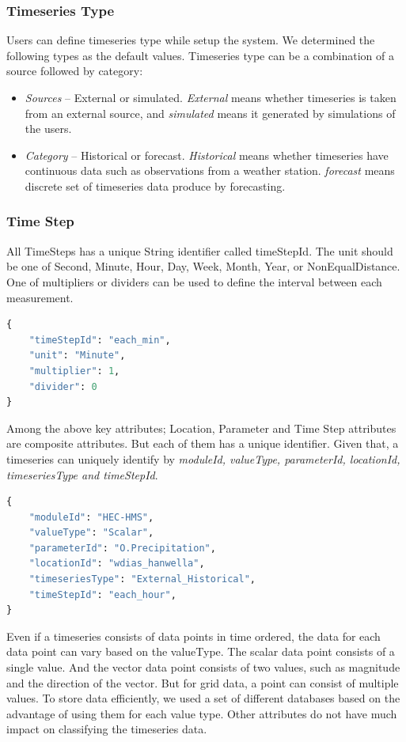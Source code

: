 \subsubsection{Timeseries Type}
Users can define timeseries type while setup the system. We determined the following types as the default values. Timeseries type can be a combination of a source followed by category:
\begin{itemize}
  \item \emph{Sources} -- External or simulated. \emph{External} means whether timeseries is taken from an external source, and \emph{simulated} means it generated by simulations of the users.
  \item \emph{Category} -- Historical or forecast. \emph{Historical} means whether timeseries have continuous data such as observations from a weather station. \emph{forecast} means discrete set of timeseries data produce by forecasting.
\end{itemize}

\subsubsection{Time Step}
All TimeSteps has a unique String identifier called timeStepId. The unit should be one of Second, Minute, Hour, Day, Week, Month, Year, or NonEqualDistance. One of multipliers or dividers can be used to define the interval between each measurement.
\begin{lstlisting}[language=Python]
{
    "timeStepId": "each_min",
    "unit": "Minute",
    "multiplier": 1,
    "divider": 0
}
\end{lstlisting}

Among the above key attributes; Location, Parameter and Time Step attributes are composite attributes. But each of them has a unique identifier.
Given that, a timeseries can uniquely identify by \emph{moduleId, valueType, parameterId, locationId, timeseriesType and timeStepId}.
\begin{lstlisting}[language=Python]
{
	"moduleId": "HEC-HMS",
	"valueType": "Scalar",
	"parameterId": "O.Precipitation",
	"locationId": "wdias_hanwella",
	"timeseriesType": "External_Historical",
	"timeStepId": "each_hour",
}
\end{lstlisting}

Even if a timeseries consists of data points in time ordered, the data for each data point can vary based on the valueType. The scalar data point consists of a single value. And the vector data point consists of two values, such as magnitude and the direction of the vector. But for grid data, a point can consist of multiple values. To store data efficiently, we used a set of different databases based on the advantage of using them for each value type. Other attributes do not have much impact on classifying the timeseries data.

